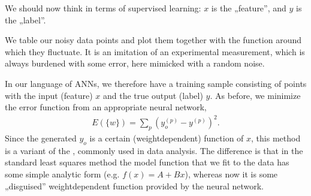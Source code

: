 \documentclass[a4paper,12pt,polish]{jupyterBook}
\begin{document}
\sphinxAtStartPar
We should now think in terms of supervised learning: \(x\) is the „feature”, and \(y\) is the „label”.

\sphinxAtStartPar
We table our noisy data points and plot them together with the function  around which they fluctuate. It is an imitation of an experimental measurement, which is always burdened with some error, here mimicked with a random noise.
\begin{sphinxVerbatimInput}

\begin{sphinxVerbatim}[commandchars=\\\{\}]
\PYG{p}{[}    \PYG{p}{]}    
                   
                     
\end{sphinxVerbatim}
\end{sphinxVerbatimInput}
\begin{sphinxVerbatimOutput}

\noindent{}
\end{sphinxVerbatimOutput}

\sphinxAtStartPar
In our language of ANNs, we therefore have a training sample consisting of points with the input (feature) \(x\) and the true output (label) \(y\). As before, we minimize the error function from an appropriate neural network,
\begin{equation*}
\begin{split}E(\{w \}) = \sum_p (y_o^{(p)} - y^{(p)})^2. \end{split}
\end{equation*}
\sphinxAtStartPar
Since the generated \(y_o\) is a certain (weight\sphinxhyphen{}dependent) function of \(x\), this method is a variant of the , commonly used in data analysis. The difference is that in the standard least squares method the model function that we fit to the data has some simple analytic form (e.g. \( f(x) = A + B x\)), whereas now it is some „disguised” weight\sphinxhyphen{}dependent function provided by the neural network.
\end{document}
